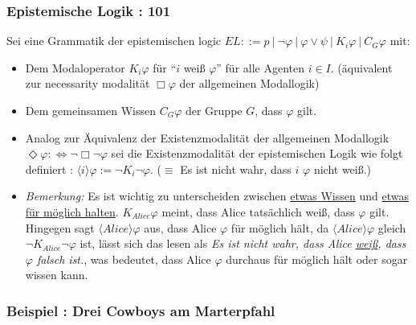 \documentclass[11pt,a4paper]{paper}
\begin{document}
\subsubsection*{Epistemische Logik : 101}

Sei eine Grammatik der epistemischen logic $EL ::= p\ |\ \neg \varphi\ |\ \varphi \vee \psi\ |\ K_i \varphi\ |\ C_G\varphi$ mit:

\begin{itemize}
	\item  Dem Modaloperator $K_i \varphi$ für  \enquote{$i$ weiß $\varphi$} für alle Agenten $i \in I$. (äquivalent zur necessarity modalität $\Box\varphi$ der allgemeinen Modallogik)
	\item Dem gemeinsamen Wissen $C_G\varphi$ der Gruppe $G$, dass $\varphi$ gilt.
	\item Analog zur Äquivalenz der Existenzmodalität der allgemeinen Modallogik $\Diamond \varphi :\Leftrightarrow \neg\Box \neg \varphi$ sei die Existenzmodalität der epistemischen Logik wie folgt definiert : $\langle i \rangle\varphi := \neg K_i \neg \varphi$. ($\equiv$ Es ist nicht wahr, dass $i$ $\varphi$ nicht weiß.)
	\item \emph{Bemerkung:} Es ist wichtig zu unterscheiden zwischen \underline{etwas Wissen} und \underline{etwas für möglich halten}. $K_{Alice} \varphi$ meint, dass Alice tatsächlich weiß, dass $\varphi$ gilt. Hingegen sagt $\langle Alice \rangle \varphi$ aus, dass Alice $\varphi$ für möglich hält, da $\langle Alice \rangle \varphi$ gleich $\neg K_{Alice} \neg \varphi$ ist, lässt sich das lesen als \emph{Es ist nicht wahr, dass Alice \underline{weiß}, dass $\varphi$ falsch ist.}, was bedeutet, dass Alice $\varphi$ durchaus für möglich hält oder sogar wissen kann.
\end{itemize}

\subsubsection*{Beispiel : Drei Cowboys am Marterpfahl}
\end{document}
